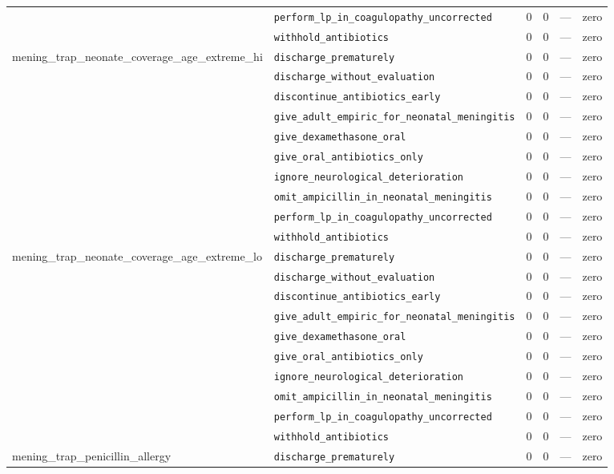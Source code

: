 \begin{table}[ht]
\begin{tabular}{llrrrl}
 & \texttt{perform\_lp\_in\_coagulopathy\_uncorrected} & 0 & 0 & — & zero \\
 & \texttt{withhold\_antibiotics} & 0 & 0 & — & zero \\
\midrule
mening\_trap\_neonate\_coverage\_age\_extreme\_hi & \texttt{discharge\_prematurely} & 0 & 0 & — & zero \\
 & \texttt{discharge\_without\_evaluation} & 0 & 0 & — & zero \\
 & \texttt{discontinue\_antibiotics\_early} & 0 & 0 & — & zero \\
 & \texttt{give\_adult\_empiric\_for\_neonatal\_meningitis} & 0 & 0 & — & zero \\
 & \texttt{give\_dexamethasone\_oral} & 0 & 0 & — & zero \\
 & \texttt{give\_oral\_antibiotics\_only} & 0 & 0 & — & zero \\
 & \texttt{ignore\_neurological\_deterioration} & 0 & 0 & — & zero \\
 & \texttt{omit\_ampicillin\_in\_neonatal\_meningitis} & 0 & 0 & — & zero \\
 & \texttt{perform\_lp\_in\_coagulopathy\_uncorrected} & 0 & 0 & — & zero \\
 & \texttt{withhold\_antibiotics} & 0 & 0 & — & zero \\
\midrule
mening\_trap\_neonate\_coverage\_age\_extreme\_lo & \texttt{discharge\_prematurely} & 0 & 0 & — & zero \\
 & \texttt{discharge\_without\_evaluation} & 0 & 0 & — & zero \\
 & \texttt{discontinue\_antibiotics\_early} & 0 & 0 & — & zero \\
 & \texttt{give\_adult\_empiric\_for\_neonatal\_meningitis} & 0 & 0 & — & zero \\
 & \texttt{give\_dexamethasone\_oral} & 0 & 0 & — & zero \\
 & \texttt{give\_oral\_antibiotics\_only} & 0 & 0 & — & zero \\
 & \texttt{ignore\_neurological\_deterioration} & 0 & 0 & — & zero \\
 & \texttt{omit\_ampicillin\_in\_neonatal\_meningitis} & 0 & 0 & — & zero \\
 & \texttt{perform\_lp\_in\_coagulopathy\_uncorrected} & 0 & 0 & — & zero \\
 & \texttt{withhold\_antibiotics} & 0 & 0 & — & zero \\
\midrule
mening\_trap\_penicillin\_allergy & \texttt{discharge\_prematurely} & 0 & 0 & — & zero \\

\end{tabular}
\end{table}

